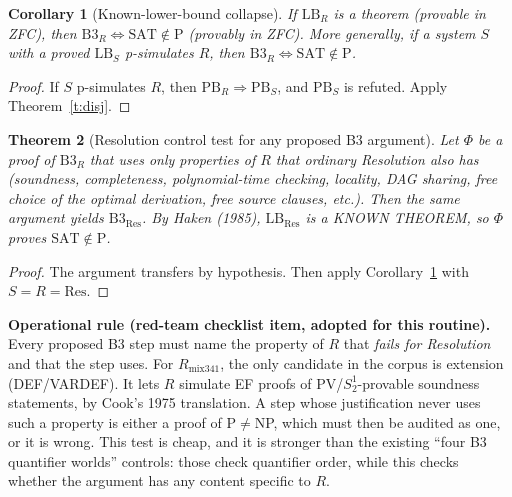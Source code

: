 \documentclass[11pt]{article}
\newtheorem{theorem}{Theorem}
\newtheorem{corollary}[theorem]{Corollary}
\newcommand{\SAT}{\mathrm{SAT}}
\newcommand{\PB}{\mathrm{PB}}
\newcommand{\LB}{\mathrm{LB}}
\begin{document}
\begin{corollary}[Known-lower-bound collapse]\label{c:collapse}
If $\LB_R$ is a theorem (provable in ZFC), then $\mathrm{B3}_R \iff \SAT\notin\mathrm P$ (provably in ZFC).
More generally, if a system $S$ with a proved $\LB_S$ p-simulates $R$, then $\mathrm{B3}_R\iff\SAT\notin\mathrm P$.
\end{corollary}
\begin{proof}
If $S$ p-simulates $R$, then $\PB_R\Rightarrow\PB_S$, and $\PB_S$ is refuted. Apply Theorem~\ref{t:disj}.
\end{proof}

\begin{theorem}[Resolution control test for any proposed B3 argument]\label{t:control}
Let $\Phi$ be a proof of $\mathrm{B3}_R$ that uses only properties of $R$ that ordinary Resolution
also has (soundness, completeness, polynomial-time checking, locality, DAG sharing, free choice of the
optimal derivation, free source clauses, etc.). Then the same argument yields $\mathrm{B3}_{\mathrm{Res}}$.
By Haken (1985), $\LB_{\mathrm{Res}}$ is a KNOWN THEOREM, so $\Phi$ proves $\SAT\notin\mathrm P$.
\end{theorem}
\begin{proof}
The argument transfers by hypothesis. Then apply Corollary~\ref{c:collapse} with $S=R=\mathrm{Res}$.
\end{proof}

\noindent\textbf{Operational rule (red-team checklist item, adopted for this routine).}
Every proposed B3 step must name the property of $R$ that \emph{fails for Resolution} and that the step
uses. For $R_{\mathrm{mix341}}$, the only candidate in the corpus is extension (DEF/VARDEF). It lets
$R$ simulate EF proofs of PV/$S^1_2$-provable soundness statements, by Cook's 1975 translation. A step
whose justification never uses such a property is either a proof of P$\neq$NP, which must then be
audited as one, or it is wrong. This test is cheap, and it is stronger than the existing ``four B3
quantifier worlds'' controls: those check quantifier order, while this checks whether the argument has
any content specific to $R$.
\end{document}
